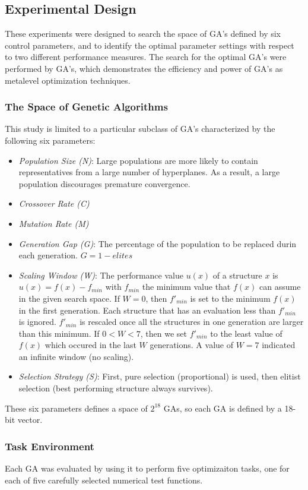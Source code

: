 \documentclass[12pt]{article}
\begin{document}
\subsection{Experimental Design}
These experiments were designed to search the space of GA's defined by six control parameters, and to identify the optimal parameter settings with respect to two different performance measures. The search for the optimal GA's were performed by GA's, which demonstrates the efficiency and power of GA's as metalevel optimization techniques.

\subsubsection{The Space of Genetic Algorithms}
This study is limited to a particular subclass of GA's characterized by the following six parameters:
\begin{itemize}
\item \textit{Population Size (N)}: Large populations are more likely to contain representatives from a large number of hyperplanes. As a result, a large population discourages premature convergence.
\item \textit{Crossover Rate (C)}
\item \textit{Mutation Rate (M)}
\item \textit{Generation Gap (G)}: The percentage of the population to be replaced durin each generation. $G = 1 - elites$
\item \textit{Scaling Window (W)}: The performance value $u(x)$ of a structure $x$ is $u(x) = f(x) - f_{min}$ with $f_{min}$ the minimum value that $f(x)$ can assume in the given search space. If $W = 0$, then $f'_{min}$ is set to the minimum $f(x)$ in the first generation. Each structure that has an evaluation less than $f'_{min}$ is ignored. $f'_{min}$ is rescaled once all the structures in one generation are larger than this minimum. If $0 < W < 7$, then we set $f'_{min}$ to the least value of $f(x)$ which occured in the last $W$ generations. A value of $W = 7$ indicated an infinite window (no scaling).
\item \textit{Selection Strategy (S)}: First, pure selection (proportional) is used, then elitist selection (best performing structure always survives).
\end{itemize}
These six parameters defines a space of $2^{18}$ GAs, so each GA is defined by a 18-bit vector.

\subsubsection{Task Environment}
Each GA was evaluated by using it to perform five optimizaiton tasks, one for each of five carefully selected numerical test functions.
\end{document}

